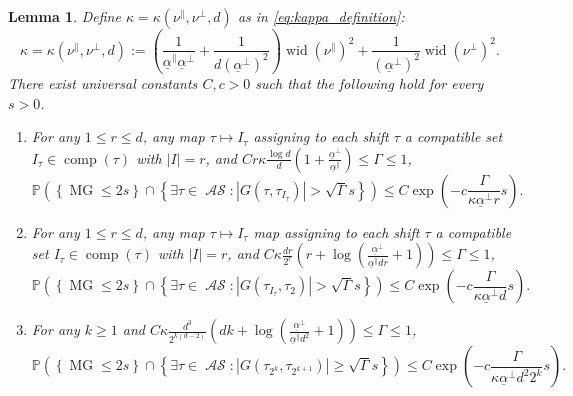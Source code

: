\documentclass[11pt, reqno]{amsart}
\newtheorem{lemma}[theorem]{Lemma}
\DeclareMathOperator{\MG}{MG}
\DeclareMathOperator{\AS}{\mathcal{AS}}
\DeclareMathOperator{\comp}{comp}
\renewcommand{\P}{\mathbb{P}}
\DeclareMathOperator{\wid}{wid}
\numberwithin{equation}{section}
\begin{document}
\begin{lemma}\label{lem:Chaining bounds coarse graining}   
Define $\kappa=\kappa(\nu^{\parallel},\nu^{\perp},d)$ as in \eqref{eq:kappa_definition}:
\begin{equation*}
\kappa = \kappa(\nu^\parallel, \nu^\perp,d) := \left( \frac{1}{\underline{\alpha}^{\parallel}\underline{\alpha}^{\perp}} +\frac{1}{d (\underline{\alpha}^{\perp})^{2}}\right)\wid (\nu^{\parallel})^{2}+\frac{1}{(\underline{\alpha}^{\perp})^{2}}\wid(\nu^{\perp})^{2}.
\end{equation*}        
There exist universal constants $C,c>0$ such that the following hold for every $s>0$.
\begin{enumerate}
\item 
For any $1 \leq r \leq d$, any map $\tau \mapsto I_\tau$  assigning to each shift $\tau$ a compatible set $I_{\tau}\in \comp(\tau)$ with $|I|=r$, and 
$ C r \kappa \frac{\log d}{ d} \left(1+\frac{\underline{\alpha}^{\perp}}{\underline{\alpha}^{\parallel}} \right) \leq \Gamma \leq 1$,
\begin{equation*}
\P\left( \left\{\MG \leq 2s \right\} \cap \left\{ \exists \tau \in \AS\colon|G(\tau,\tau_{I_{\tau}})|>\sqrt{\Gamma} s\right\} \right) \leq C\exp \left(-c\frac{\Gamma}{\kappa \underline{\alpha}^{\perp} r} s \right).
\end{equation*}
\item
For any $1 \leq r \leq d$, any map $\tau \mapsto I_\tau$ map assigning to each shift $\tau$ a compatible set $I_{\tau}\in \comp(\tau)$ with $|I|=r$, and 
$C \kappa \frac{dr}{2^r}\left(r+\log\left(\frac{\underline{\alpha}^{\perp}}{ \underline{\alpha}^{\parallel}dr}+1 \right) \right)\leq \Gamma \leq 1 $,
\begin{equation*}
\P\left( \left\{\MG \leq 2s \right\} \cap \left\{ \exists \tau \in \AS\colon|G(\tau_{I_{\tau}},\tau_{2})|>\sqrt{\Gamma} s \right\} \right) \leq C\exp \left( -c\frac{\Gamma}{\kappa \underline{\alpha}^{\perp} d} s \right).
\end{equation*}
\item
For any $k\ge 1$ and  
$C \kappa \frac{d^3}{2^{k(d-2)}}\left(dk +\log\left(\frac{\underline{\alpha}^{\perp}}{\underline{\alpha}^{\parallel}d^2}+1\right)\right) \leq \Gamma \leq 1$,
\begin{equation*}
\P\left(\left\{\MG \leq 2s \right\} \cap \left\{\exists \tau \in \AS\colon |G(\tau_{2^k},\tau_{2^{k+1}})|\ge \sqrt{\Gamma} s \right\} \right) \leq C\exp\left(-c \frac{\Gamma}{\kappa \underline{\alpha}^{\perp} d^2 2^k}s  \right).
\end{equation*}
\end{enumerate}
\end{lemma}
\end{document}
